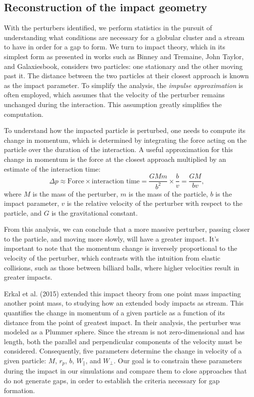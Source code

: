 \documentclass[draft]{aa}
\begin{document}
  \subsection{Reconstruction of the impact geometry}
    
    With the perturbers identified, we perform statistics in the pursuit of understanding what conditions are necessary for a globular cluster and a stream to have in order for a gap to form. We turn to impact theory, which in its simplest form as presented in works such as Binney and Tremaine, John Taylor, and Galaxiesbook, considers two particles: one stationary and the other moving past it. The distance between the two particles at their closest approach is known as the impact parameter. To simplify the analysis, the \textit{impulse approximation} is often employed, which assumes that the velocity of the perturber remains unchanged during the interaction. This assumption greatly simplifies the computation.

    To understand how the impacted particle is perturbed, one needs to compute its change in momentum, which is determined by integrating the force acting on the particle over the duration of the interaction. A useful approximation for this change in momentum is the force at the closest approach multiplied by an estimate of the interaction time:
    \begin{equation} 
      \Delta p \approx \text{Force} \times \text{interaction time} = \frac{GMm}{b^2} \times \frac{b}{v} = \frac{GM}{bv}, 
      \end{equation} \label{eq:change_in_momentum}
    where $M$ is the mass of the perturber, $m$ is the mass of the particle, $b$ is the impact parameter, $v$ is the relative velocity of the perturber with respect to the particle, and $G$ is the gravitational constant.

    From this analysis, we can conclude that a more massive perturber, passing closer to the particle, and moving more slowly, will have a greater impact. It's important to note that the momentum change is inversely proportional to the velocity of the perturber, which contrasts with the intuition from elastic collisions, such as those between billiard balls, where higher velocities result in greater impacts.

    Erkal et al. (2015) extended this impact theory from one point mass impacting another point mass, to studying how an extended body impacts as stream. This quantifies the change in momentum of a given particle as a function of its distance from the point of greatest impact. In their analysis, the perturber was modeled as a Plummer sphere. Since the stream is not zero-dimensional and has length, both the parallel and perpendicular components of the velocity must be considered. Consequently, five parameters determine the change in velocity of a given particle: $M$, $r_p$, $b$, $W_\parallel$, and $W_\perp$. Our goal is to constrain these parameters during the impact in our simulations and compare them to close approaches that do not generate gaps, in order to establish the criteria necessary for gap formation.
\end{document}
